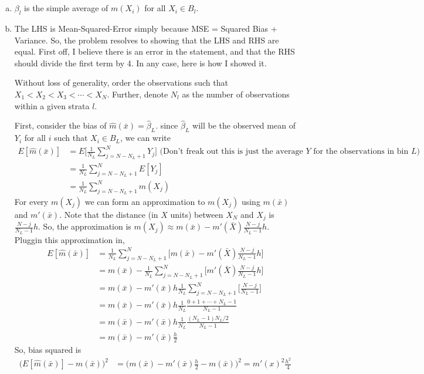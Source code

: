 \documentclass{article}[12pt]
\begin{document}
\section{}
\begin{enumerate}[(a)]
	\item $\beta_l$ is the simple average of $m(X_i)$ for all $X_i \in B_l$.
	\item The LHS is Mean-Squared-Error simply because MSE = Squared Bias + Variance. So, the problem resolves to showing that the LHS and RHS are equal. First off, I believe there is an error in the statement, and that the RHS should divide the first term by 4. In any case, here is how I showed it.

	Without loss of generality, order the observations such that $X_1 < X_2 < X_3 < \cdots < X_N$. Further, denote $N_l$ as the number of observations within a given strata $l$.

	First, consider the bias of $\hat{m}(\bar{x}) = \hat{\beta}_L$. since $\hat{\beta}_L$ will be the observed mean of $Y_i$ for all $i$ such that $X_i \in B_L$, we can write
	\begin{align*}
		E[\hat{m}(\bar{x})] &= E\Big[\frac{1}{N_L} \sum_{j=N - N_L + 1}^{N} Y_j \Big] \mbox{ (Don't freak out this is just the average $Y$ for the observations in bin $L$)} \\
		&= \frac{1}{N_L} \sum_{j=N - N_L + 1}^{N} E[Y_j] \\
		&= \frac{1}{N_L} \sum_{j=N - N_L + 1}^{N} m(X_j)
	\end{align*}
	For every $m(X_j)$ we can form an approximation to $m(X_j)$ using $m(\bar{x})$ and $m'(\bar{x})$. Note that the distance (in $X$ units) between $X_N$ and $X_j$ is $\frac{N-j}{N_L-1}h$. So, the approximation is $m(X_j) \approx m(\bar{x}) - m'(\bar{X}) \frac{N-j}{N_L-1}h$. Pluggin this approximation in,
	\begin{align*}
		E[\hat{m}(\bar{x})] &= \frac{1}{N_L} \sum_{j=N - N_L + 1}^{N} \Bigg[ m(\bar{x}) - m'(\bar{X}) \frac{N-j}{N_L-1}h \Bigg] \\
		&= m(\bar{x}) - \frac{1}{N_L} \sum_{j=N - N_L + 1}^{N} \Bigg[ m'(\bar{X}) \frac{N-j}{N_L-1}h \Bigg] \\
		&= m(\bar{x}) - m'(\bar{x}) h \frac{1}{N_L} \sum_{j=N - N_L + 1}^{N} \Bigg[\frac{N-j}{N_L-1} \Bigg] \\
		&= m(\bar{x}) - m'(\bar{x}) h \frac{1}{N_L} \frac{0 + 1 + \cdots + N_L - 1}{N_L - 1} \\
		&= m(\bar{x}) - m'(\bar{x}) h \frac{1}{N_L} \frac{(N_L-1)N_L / 2}{N_L - 1} \\
		&= m(\bar{x}) - m'(\bar{x}) \frac{h}{2}
	\end{align*}
	So, bias squared is
	\begin{align*}
		\Big( E[\hat{m}(\bar{x})] - m(\bar{x}) \Big)^2 &= \Big( m(\bar{x}) - m'(\bar{x}) \frac{h}{2} - m(\bar{x}) \Big)^2 = m'(x)^2 \frac{h^2}{4}
	\end{align*}


\end{enumerate}
\end{document}
